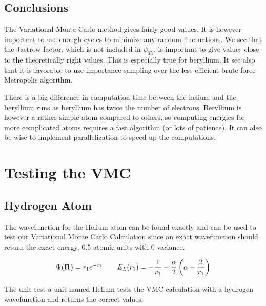 \documentclass[11pt]{article}
\begin{document}
\subsection{Conclusions}

The Variational Monte Carlo method gives fairly good values. It is
however important to use enough cycles to minimize any random fluctuations.
We see that the Jastrow factor, which is not included in $\psi_{T1}$,
is important to give values close to the theoretically right values.
This is especially true for beryllium. It see also that it is favorable
to use importance sampling over the less efficient brute force Metropolis
algorithm. 

There is a big difference in computation time between the helium and
the beryllium runs as beryllium has twice the number of electrons.
Beryllium is however a rather simple atom compared to others, so computing
energies for more complicated atoms requires a fast algorithm (or
lots of patience). It can also be wise to implement parallelization
to speed up the computations.




\newpage
\appendix
	
	\section{Testing the VMC}
		\subsection{Hydrogen Atom}
			The wavefunction for the Helium atom can be found exactly and can be used to test our Variational Monte Carlo Calculation since an exact wavefunction should return the exact energy, \( 0.5 \) atomic units with \(0\) variance.

			\[ \Psi(\vb{R}) = r_1 e^{-r_1}  \qquad E_L(r_1) = -\frac{1}{r_1} - \frac{\alpha}{2} \left( \alpha - \frac{2}{r_1} \right) \]

			The unit test a unit named Helium tests the VMC calculation with a hydrogen wavefunction and returns the correct values.
\end{document}
